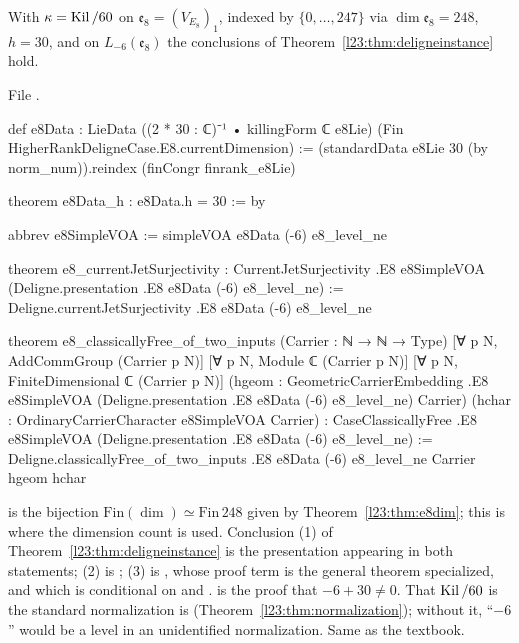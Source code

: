 \begin{theorem}\label{l23:thm:e8deligne}
With $\kappa=\operatorname{Kil}/60$ on $\mathfrak e_8=(V_{E_8})_1$, indexed by $\{0,\dots,247\}$ via $\dim\mathfrak e_8=248$, $h=30$, and on
$L_{-6}(\mathfrak e_8)$ the conclusions of Theorem~\ref{l23:thm:deligneinstance} hold.
\end{theorem}
\noindent File .
\begin{leancode}
def e8Data : LieData ((2 * 30 : ℂ)⁻¹ • killingForm ℂ e8Lie) (Fin HigherRankDeligneCase.E8.currentDimension) :=
  (standardData e8Lie 30 (by norm_num)).reindex (finCongr finrank_e8Lie)

theorem e8Data_h : e8Data.h = 30 := by

abbrev e8SimpleVOA := simpleVOA e8Data (-6) e8_level_ne

theorem e8_currentJetSurjectivity :
    CurrentJetSurjectivity .E8 e8SimpleVOA (Deligne.presentation .E8 e8Data (-6) e8_level_ne) :=
  Deligne.currentJetSurjectivity .E8 e8Data (-6) e8_level_ne

theorem e8_classicallyFree_of_two_inputs
    (Carrier : ℕ → ℕ → Type)
    [∀ p N, AddCommGroup (Carrier p N)]
    [∀ p N, Module ℂ (Carrier p N)]
    [∀ p N, FiniteDimensional ℂ (Carrier p N)]
    (hgeom : GeometricCarrierEmbedding .E8 e8SimpleVOA
      (Deligne.presentation .E8 e8Data (-6) e8_level_ne) Carrier)
    (hchar : OrdinaryCarrierCharacter e8SimpleVOA Carrier) :
    CaseClassicallyFree .E8 e8SimpleVOA (Deligne.presentation .E8 e8Data (-6) e8_level_ne) :=
  Deligne.classicallyFree_of_two_inputs .E8 e8Data (-6) e8_level_ne Carrier hgeom hchar
\end{leancode}

\begin{dictionary}
 is the bijection $\mathrm{Fin}(\dim)\simeq\mathrm{Fin}\,248$ given by Theorem~\ref{l23:thm:e8dim}; this is
where the dimension count is used. Conclusion (1) of Theorem~\ref{l23:thm:deligneinstance} is the presentation
 appearing in both statements; (2) is ; (3) is
, whose proof term is the general theorem specialized, and which is conditional on 
and .  is the proof that $-6+30\ne0$. That $\operatorname{Kil}/60$ is the standard normalization is 
(Theorem~\ref{l23:thm:normalization}); without it, ``$-6$'' would be a level in an unidentified normalization. Same as the textbook.
\end{dictionary}


